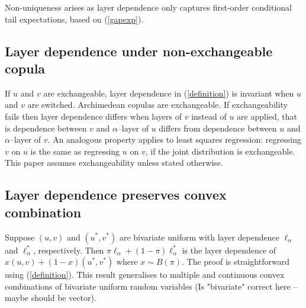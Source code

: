 \documentclass[authoryear]{elsarticle}
\newcommand{\E}{{\mathrm E}}
\newcommand{\eref}[1]{(\ref{#1})}
\begin{document}
Non-uniqueness arises as layer dependence only captures first-order conditional tail expectations, based on \eref{gapexp}.

\subsection{Layer dependence under non-exchangeable copula}

If $u$ and $v$ are exchangeable, layer dependence in \eref{definition} is invariant when $u$ and $v$ are switched. Archimedean copulas \citep{mcneil2005qrm} are exchangeable. If exchangeability fails then layer dependence differs when layers of $v$ instead of $u$ are applied, that is dependence between $v$ and $\alpha$--layer of $u$ differs from dependence between $u$ and $\alpha$--layer of $v$. An analogous property applies to least squares regression: regressing $v$ on $u$ is the same as  regressing $u$ on $v$, if the joint distribution is  exchangeable.  This paper assumes exchangeability unless stated otherwise.




\subsection{Layer dependence preserves convex combination}

Suppose $(u,v)$ and $(u^*,v^*)$ are bivariate uniform with layer dependence $\ell_\alpha$ and $\ell_\alpha^*$, respectively. Then  $\pi\ell_\alpha+(1-\pi)\ell_\alpha^*$ is the layer dependence of  $x(u,v)+(1-x)(u^*,v^*)$ where $x\sim B(\pi)$.  The proof  is straightforward using \eref{definition}.  This result generalises to
multiple and continuous convex combinations of bivariate uniform random variables  (Is "bivariate" correct here -- maybe should be vector).
\end{document}
